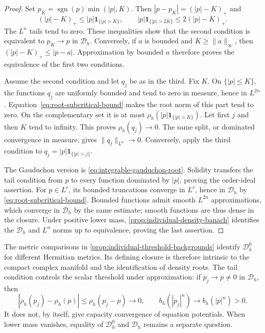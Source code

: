 \begin{proof}
Set $p_K=\operatorname{sgn}(p)\min(|p|,K)$. Then $|p-p_K|=(|p|-K)_+$ and
\[
 (|p|-K)_+\leq |p|\mathbf1_{\{|p|>K\}},\qquad
 |p|\mathbf1_{\{|p|>2K\}}\leq2(|p|-K)_+.
\]
The $L^n$ tails tend to zero. These inequalities show that the second condition is equivalent to $p_K\to p$ in $\mathcal D_h$. Conversely, if $a$ is bounded and $K\geq\|a\|_\infty$, then $(|p|-K)_+\leq|p-a|$. Approximation by bounded $a$ therefore proves the equivalence of the first two conditions.

Assume the second condition and let $q_j$ be as in the third. Fix $K$. On $\{|p|\leq K\}$, the functions $q_j$ are uniformly bounded and tend to zero in measure, hence in $L^{2n}$. Equation~\eqref{eq:root-subcritical-bound} makes the root norm of this part tend to zero. On the complementary set it is at most $\rho_h(|p|\mathbf1_{\{|p|>K\}})$. Let first $j$ and then $K$ tend to infinity. This proves $\rho_h(q_j)\to0$. The same split, or dominated convergence in measure, gives $\|q_j\|_{L^n}\to0$. Conversely, apply the third condition to $q_j=|p|\mathbf1_{\{|p|>j\}}$.

The Gauduchon version is \eqref{eq:integrable-gauduchon-root}. Solidity transfers the tail condition from $p$ to every function dominated by $|p|$, proving the order-ideal assertion. For $p\in L^r$, its bounded truncations converge in $L^r$, hence in $\mathcal D_h$ by \eqref{eq:root-subcritical-bound}. Bounded functions admit smooth $L^{2n}$ approximations, which converge in $\mathcal D_h$ by the same estimate; smooth functions are thus dense in the closure. Under positive lower mass, \cref{prop:individual-density-banach} identifies the $\mathcal D_h$ and $L^n$ norms up to equivalence, proving the last assertion.
\end{proof}

The metric comparisons in \cref{prop:individual-threshold-backgrounds} identify $\mathcal D_h^0$ for different Hermitian metrics. Its defining closure is therefore intrinsic to the compact complex manifold and the identification of density roots. The tail condition controls the scalar threshold under approximation: if $p_j\to p\ne0$ in $\mathcal D_h$, then
\[
 |\rho_h(p_j)-\rho_h(p)|\leq\rho_h(p_j-p)\longrightarrow0,
 \qquad b_h(|p_j|^n)\longrightarrow b_h(|p|^n)>0.
\]
It does not, by itself, give capacity convergence of equation potentials. When lower mass vanishes, equality of $\mathcal D_h^0$ and $\mathcal D_h$ remains a separate question.
